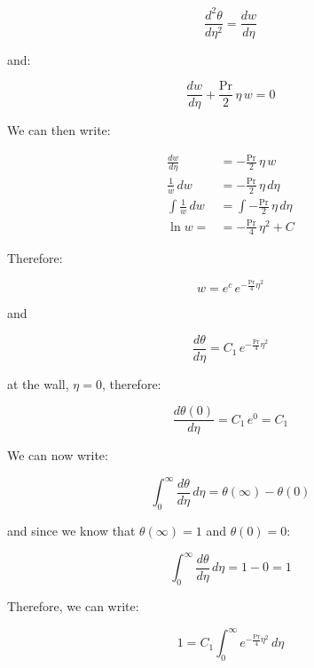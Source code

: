 \documentclass[letterpaper,12pt]{article}
\begin{document}
\begin{equation}
    \frac{d^2\theta}{d\eta^2}=\frac{dw}{d\eta}
\end{equation}

and:

\begin{equation}
    \frac{dw}{d\eta}+\frac{\text{Pr}}{2}\,\eta\,w = 0
\end{equation}

We can then write:

\begin{equation}
\begin{aligned}
    \frac{dw}{d\eta}      &= -\frac{\text{Pr}}{2}\,\eta\,w \\
    \frac{1}{w}\,dw       &= -\frac{\text{Pr}}{2}\,\eta\,d\eta \\
    \int\frac{1}{w}\,dw   &= \int-\frac{\text{Pr}}{2}\,\eta\,d\eta \\
    \ln w =               &=-\frac{\text{Pr}}{4}\,\eta^2 + C
\end{aligned}
\end{equation}

Therefore:

\begin{equation}
    w=e^{c}\,e^{-\frac{\text{Pr}}{4}\eta^2}
\end{equation}

and

\begin{equation}
    \frac{d\theta}{d\eta}=C_1\,e^{-\frac{\text{Pr}}{4}\eta^2}
\end{equation}

at the wall, $\eta=0$, therefore:

\begin{equation}
    \frac{d\theta(0)}{d\eta}=C_1\,e^{0}=C_1
\end{equation}

We can now write:

\begin{equation}
    \int_0^\infty\frac{d\theta}{d\eta}\,d\eta=\theta(\infty)-\theta(0)
\end{equation}

and since we know that $\theta(\infty)=1$ and $\theta(0)=0$:

\begin{equation}
    \int_0^\infty\frac{d\theta}{d\eta}\,d\eta=1-0=1
\end{equation}

Therefore, we can write:

\begin{equation}
    1=C_1\int_0^\infty e^{-\frac{\text{Pr}}{4}\eta^2}\,d\eta
\end{equation}
\end{document}
